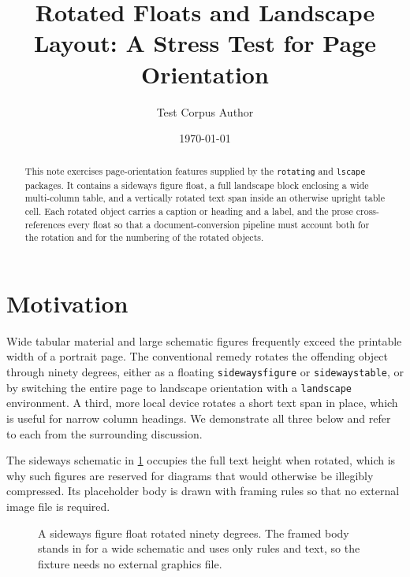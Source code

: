 \documentclass[11pt]{article}
\title{Rotated Floats and Landscape Layout: A Stress Test for Page Orientation}
\author{Test Corpus Author}
\date{\today}
\begin{document}
\maketitle

\begin{abstract}
This note exercises page-orientation features supplied by the \texttt{rotating}
and \texttt{lscape} packages. It contains a sideways figure float, a full
landscape block enclosing a wide multi-column table, and a vertically rotated
text span inside an otherwise upright table cell. Each rotated object carries a
caption or heading and a label, and the prose cross-references every float so
that a document-conversion pipeline must account both for the rotation and for
the numbering of the rotated objects.
\end{abstract}

\section{Motivation}
\label{sec:motivation}

Wide tabular material and large schematic figures frequently exceed the printable
width of a portrait page. The conventional remedy rotates the offending object
through ninety degrees, either as a floating \texttt{sidewaysfigure} or
\texttt{sidewaystable}, or by switching the entire page to landscape orientation
with a \texttt{landscape} environment. A third, more local device rotates a short
text span in place, which is useful for narrow column headings. We demonstrate
all three below and refer to each from the surrounding discussion.

The sideways schematic in \cref{fig:rotated} occupies the full text height when
rotated, which is why such figures are reserved for diagrams that would otherwise
be illegibly compressed. Its placeholder body is drawn with framing rules so that
no external image file is required.

\begin{figure}
  \centering
  \caption{A sideways figure float rotated ninety degrees. The framed body
    stands in for a wide schematic and uses only rules and text, so the fixture
    needs no external graphics file.}
  \label{fig:rotated}
\end{figure}
\end{document}
